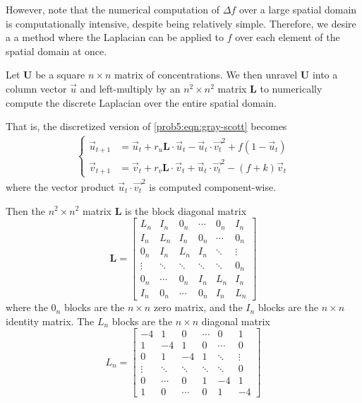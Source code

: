 However, note that the numerical computation of $\Delta f$ over a large spatial domain is computationally intensive, despite being relatively simple.
Therefore, we desire a a method where the Laplacian can be applied to $f$ over each element of the spatial domain at once.

Let $\mathbf U$ be a square $n \times n$ matrix of concentrations.
We then unravel $\mathbf U$ into a column vector $\vec u$ and left-multiply by an $n^2 \times n^2$ matrix $\mathbf L$ to numerically compute the discrete Laplacian over the entire spatial domain.

That is, the discretized version of \autoref{prob5:eqn:gray-scott} becomes
\begin{eqnarray}
    \begin{cases}
        \vec u_{t + 1} & = \vec u_t + r_u \mathbf L \cdot \vec u_t - \vec u_t \cdot \vec {v_t}^2 + f(1 - \vec u_t) \\
        \vec v_{t + 1} & = \vec v_t + r_v \mathbf L \cdot \vec v_t + \vec u_t \cdot \vec {v_t}^2 - (f + k)\vec v_t
    \end{cases}\label{prob5:eqn:discretized-gray-scott}
\end{eqnarray}
where the vector product $\vec u_t \cdot \vec {v_t}^2$ is computed component-wise.

Then the $n ^2 \times n^2$ matrix $\mathbf L$ is the block diagonal matrix
\begin{equation}
    \mathbf L = \begin{bmatrix}
        L_n    & I_n    & 0_n    & \cdots & 0_n    & I_n    \\
        I_n    & L_n    & I_n    & 0_n    & \cdots & 0_n    \\
        0_n    & I_n    & L_n    & I_n    & \ddots & \vdots \\
        \vdots & \ddots & \ddots & \ddots & \ddots & 0_n    \\
        0_n    & \cdots & 0_n    & I_n    & L_n    & I_n    \\
        I_n    & 0_n    & \cdots & 0_n    & I_n    & L_n
    \end{bmatrix}\label{prob5:eqn:laplacian}
\end{equation}
where the $0_n$ blocks are the $n \times n$ zero matrix, and the $I_n$ blocks are the $n \times n$ identity matrix.
The $L_n$ blocks are the $n \times n$ diagonal matrix
\begin{equation}
    L_n = \begin{bmatrix}
        -4     & 1      & 0      & \cdots & 0      & 1      \\
        1      & -4     & 1      & 0      & \cdots & 0      \\
        0      & 1      & -4     & 1      & \ddots & \vdots \\
        \vdots & \ddots & \ddots & \ddots & \ddots & 0      \\
        0      & \cdots & 0      & 1      & -4     & 1      \\
        1      & 0      & \cdots & 0      & 1      & -4
    \end{bmatrix}\label{prob5:eqn:laplacian-L-block}
\end{equation}

